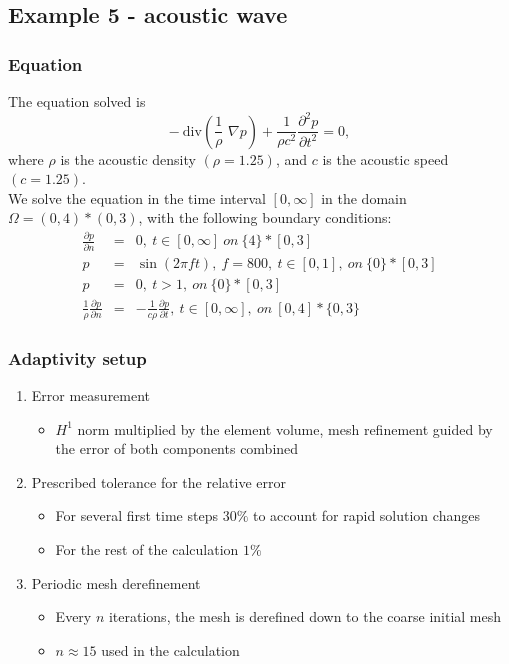 \newpage
\subsection{Example 5 - acoustic wave}
\subsubsection{Equation}
	The equation solved is
	\begin{equation}
		-\ \mathrm{div} \left( \frac{1}{\rho}\,\, \nabla p \right) + \frac{1}{\rho  c^2} \frac{\partial^2 p}{\partial t^2} = 0,
	\end{equation}
	where $\rho$ is the acoustic density $\left(\rho = 1.25\right)$, and $c$ is the acoustic speed $\left(c = 1.25\right)$.\ \\
	We solve the equation	in the time interval $\left[0, \infty \right]$ in the domain $\Omega = (0, 4) * (0, 3)$, with the following boundary conditions:
	\begin{eqnarray}
	  \frac{\partial p}{\partial n} & = & 0,\ t \in \left[0, \infty \right]\ on\ \{4\} * \left[0, 3\right] \\
		p & = & \sin\left(2\pi f t\right),\ f = 800,\ t \in \left[0, 1 \right],\ on\ \{0\} * \left[0, 3\right] \\
		p & = & 0,\ t > 1,\ on\ \{0\} * \left[0, 3 \right] \\
		\frac{1}{\rho} \frac{\partial p}{\partial n} & = & - \frac{1}{c\rho} \frac{\partial p}{\partial t},\ t \in \left[0, \infty \right],\ on\ \left[0, 4\right] * \{0, 3\}
	\end{eqnarray}
\subsubsection{Adaptivity setup}
\begin{enumerate}
  \item Error measurement
	\begin{itemize}
		\item $H^1$ norm multiplied by the element volume, mesh refinement guided by the error of both components combined
	\end{itemize}
	\item Prescribed tolerance for the relative error
	\begin{itemize}
		\item For several first time steps $30\%$ to account for rapid solution changes
		\item For the rest of the calculation $1\%$
	\end{itemize}
	\item Periodic mesh derefinement
	\begin{itemize}
		\item Every $n$ iterations, the mesh is derefined down to the coarse initial mesh
		\item $n \approx 15$ used in the calculation
	\end{itemize}
\end{enumerate}
